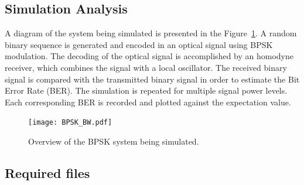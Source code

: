 \begin{refsection}
\subsection{Simulation Analysis}

A diagram of the system being simulated is presented in the Figure~\ref{fig:homodynesystem}. A random binary sequence is generated and encoded in an optical signal using BPSK modulation. The decoding of the optical signal is accomplished by an homodyne receiver, which combines the signal with a local oscillator. The received binary signal is compared with the transmitted binary signal in order to estimate the Bit Error Rate (BER). The simulation is repeated for multiple signal power levels. Each corresponding BER is recorded and plotted against the expectation value.

\begin{figure}[h]
\centering
\texttt{[image: BPSK\_BW.pdf]}
\caption{Overview of the BPSK system being simulated.}
\label{fig:homodynesystem}
\end{figure}

\subsection*{Required files}\label{Required files}


\end{refsection}
